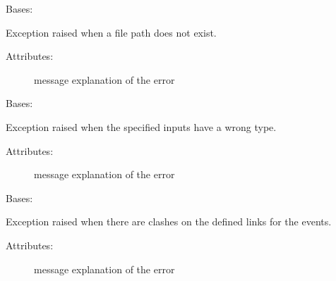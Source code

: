 
\begin{fulllineitems}
\label{\detokenize{eboa.engine:eboa.engine.errors.FilePathDoesNotExist}}
Bases: {\hyperref[\detokenize{eboa.engine:eboa.engine.errors.Error}]{}}

Exception raised when a file path does not exist.
\begin{description}
\item[{Attributes:}] \leavevmode
message \textendash{} explanation of the error

\end{description}

\end{fulllineitems}


\begin{fulllineitems}
\label{\detokenize{eboa.engine:eboa.engine.errors.InputError}}
Bases: {\hyperref[\detokenize{eboa.engine:eboa.engine.errors.Error}]{}}

Exception raised when the specified inputs have a wrong type.
\begin{description}
\item[{Attributes:}] \leavevmode
message \textendash{} explanation of the error

\end{description}

\end{fulllineitems}


\begin{fulllineitems}
\label{\detokenize{eboa.engine:eboa.engine.errors.LinksInconsistency}}
Bases: {\hyperref[\detokenize{eboa.engine:eboa.engine.errors.Error}]{}}

Exception raised when there are clashes on the defined links for the events.
\begin{description}
\item[{Attributes:}] \leavevmode
message \textendash{} explanation of the error

\end{description}

\end{fulllineitems}

